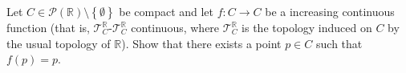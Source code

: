 \begin{problem}
    Let \( C \in \mathcal{P}\left(\mathbb{R}\right) \setminus \left\{\emptyset\right\} \) be compact and let \( f \colon C \longrightarrow C \) be a increasing continuous function (that is, \( \mathcal{T}^{\mathbb{R}}_C \)-\( \mathcal{T}^{\mathbb{R}}_C \) continuous, where \( \mathcal{T}^{\mathbb{R}}_C \) is the topology induced on \( C \) by the usual topology of \( \mathbb{R} \)). Show that there exists a point \( p \in C \) such that \( f\left(p\right) = p \).
\end{problem}
